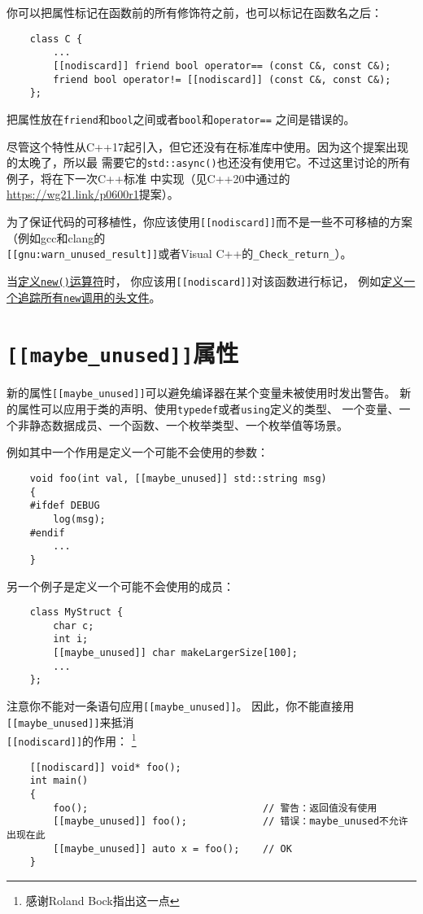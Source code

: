 你可以把属性标记在函数前的所有修饰符之前，也可以标记在函数名之后：
\begin{lstlisting}
    class C {
        ...
        [[nodiscard]] friend bool operator== (const C&, const C&);
        friend bool operator!= [[nodiscard]] (const C&, const C&);
    };
\end{lstlisting}
把属性放在\texttt{friend}和\texttt{bool}之间或者\texttt{bool}和\texttt{operator==}
之间是错误的。

尽管这个特性从C++17起引入，但它还没有在标准库中使用。因为这个提案出现的太晚了，所以最
需要它的\texttt{std::async()}也还没有使用它。不过这里讨论的所有例子，将在下一次C++标准
中实现（见C++20中通过的\url{https://wg21.link/p0600r1}提案）。

为了保证代码的可移植性，你应该使用\texttt{[[nodiscard]]}而不是一些不可移植的方案
（例如gcc和clang的\\
\texttt{[[gnu:warn\_unused\_result]]}或者Visual C++的\texttt{\_Check\_return\_}）。

当\hyperref[ch30.2.2]{定义\texttt{new()}运算符}时，
你应该用\texttt{[[nodiscard]]}对该函数进行标记，
例如\hyperref[ch30.4]{定义一个追踪所有\texttt{new}调用的头文件}。


\section{\texttt{[[maybe\_unused]]}属性}
新的属性\texttt{[[maybe\_unused]]}可以避免编译器在某个变量未被使用时发出警告。
新的属性可以应用于类的声明、使用\texttt{typedef}或者\texttt{using}定义的类型、
一个变量、一个非静态数据成员、一个函数、一个枚举类型、一个枚举值等场景。

例如其中一个作用是定义一个可能不会使用的参数：
\begin{lstlisting}
    void foo(int val, [[maybe_unused]] std::string msg)
    {
    #ifdef DEBUG
        log(msg);
    #endif
        ...
    }
\end{lstlisting}
另一个例子是定义一个可能不会使用的成员：
\begin{lstlisting}
    class MyStruct {
        char c;
        int i;
        [[maybe_unused]] char makeLargerSize[100];
        ...
    };
\end{lstlisting}
注意你不能对一条语句应用\texttt{[[maybe\_unused]]}。
因此，你不能直接用\texttt{[[maybe\_unused]]}来抵消\\
\texttt{[[nodiscard]]}的作用：
\footnote{感谢Roland Bock指出这一点}
\begin{lstlisting}
    [[nodiscard]] void* foo();
    int main()
    {
        foo();                              // 警告：返回值没有使用
        [[maybe_unused]] foo();             // 错误：maybe_unused不允许出现在此
        [[maybe_unused]] auto x = foo();    // OK
    }
\end{lstlisting}


